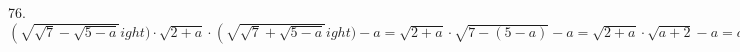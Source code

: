76. $\left(\sqrt{\sqrt{7}-\sqrt{5-a}}
ight)\cdot\sqrt{2+a}\cdot\left(\sqrt{\sqrt{7}+\sqrt{5-a}}
ight)-a=
\sqrt{2+a}\cdot\sqrt{7-(5-a)}-a=\sqrt{2+a}\cdot\sqrt{a+2}-a=a+2-a=2.$\\
